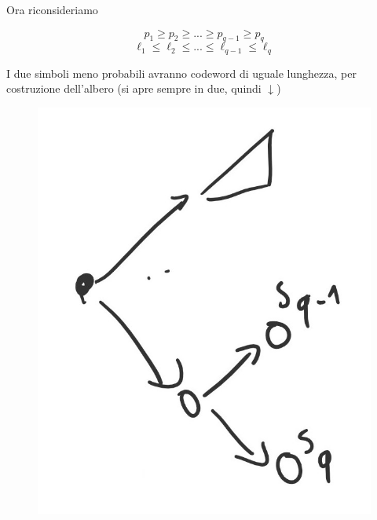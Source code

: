 Ora riconsideriamo

\begin{equation*}
p_1 \geq p_2 \geq ... \geq p_{q-1} \geq p_q
\end{equation*}
\begin{equation*}
\ell_1 \leq \ell_2 \leq ... \leq \ell_{q-1} \leq \ell_q
\end{equation*}

I due simboli meno probabili avranno codeword di uguale lunghezza, per costruzione dell'albero (si apre sempre in due, quindi $\downarrow$)

\begin{figure}[h]
	\centering
	\includegraphics[width=0.3\linewidth]{immagini/img17}
\end{figure}

